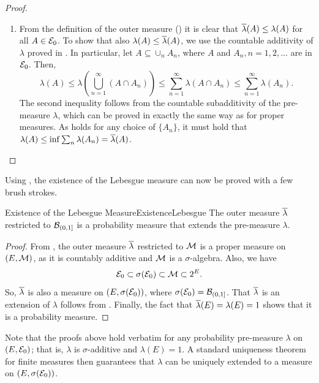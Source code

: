 \begin{proof}
\begin{enumerate}
		\item From the definition of the outer measure () it is clear that \(\overline{\lambda}(A) \le \lambda(A)\) for all \(A \in \mathcal{E}_0\). To show that also \(\lambda(A) \le \overline{\lambda}(A)\), we use the countable additivity of \(\lambda\) proved in . In particular, let \(A \subseteq \cup_n A_n\), where \(A\) and \(A_n, n=1, 2, \dots\) are in \(\mathcal{E}_0\). Then,
		      \begin{equation}
			      \lambda(A) \le \lambda\left(\bigcup_{n=1}^\infty (A \cap A_n)\right) \le \sum_{n=1}^\infty \lambda(A \cap A_n) \le \sum_{n=1}^\infty \lambda(A_n).
			      \label{eq:MeasureComparison}
		      \end{equation}
		      The second inequality follows from the countable subadditivity of the pre-measure \(\lambda\), which can be proved in exactly the same way as for proper measures. As  holds for any choice of \(\{A_n\}\), it must hold that \(\lambda(A) \le \inf \sum_n \lambda(A_n) = \overline{\lambda}(A)\).
	\end{enumerate}
\end{proof}

Using , the existence of the Lebesgue measure can now be proved with a few brush strokes.

\begin{thm}{Existence of the Lebesgue Measure}{ExistenceLebesgue}
	The outer measure \(\overline{\lambda}\) restricted to \(\mathcal{B}_{\lparen 0,1 \rbrack}\) is a probability measure that extends the pre-measure \(\lambda\).
\end{thm}

\begin{proof}
	From , the outer measure \(\overline{\lambda}\) restricted to \(\mathcal{M}\) is a proper measure on \((E, \mathcal{M})\), as it is countably additive and \(\mathcal{M}\) is a \(\sigma\)-algebra. Also, we have
	\begin{equation*}
		\mathcal{E}_0 \subset \sigma(\mathcal{E}_0) \subset \mathcal{M} \subset 2^E.
	\end{equation*}
	So, \(\overline{\lambda}\) is also a measure on \((E, \sigma(\mathcal{E}_0))\), where \(\sigma(\mathcal{E}_0) = \mathcal{B}_{\lparen 0,1 \rbrack}\). That \(\overline{\lambda}\) is an extension of \(\lambda\) follows from . Finally, the fact that \(\overline{\lambda}(E) = \lambda(E) = 1\) shows that it is a probability measure.
\end{proof}

Note that the proofs above hold verbatim for any probability pre-measure \(\lambda\) on \((E, \mathcal{E}_0)\); that is, \(\lambda\) is \(\sigma\)-additive and \(\lambda(E) = 1\). A standard uniqueness theorem for finite measures then guarantees that \(\lambda\) can be uniquely extended to a measure on \((E, \sigma(\mathcal{E}_0))\).
